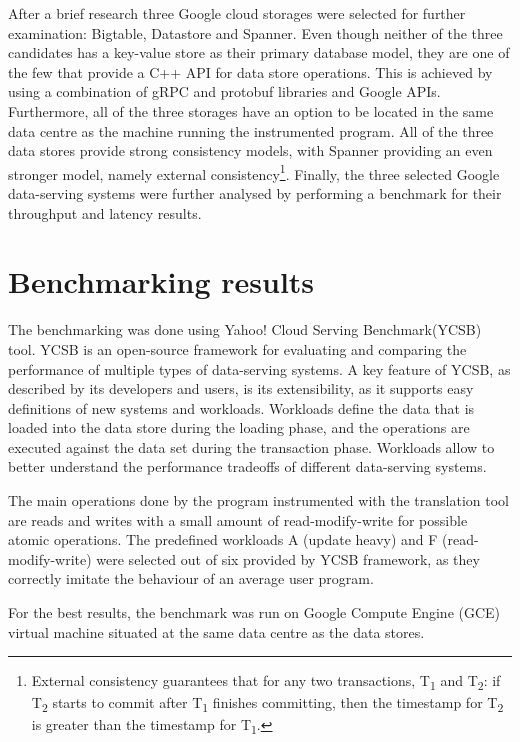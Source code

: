 \documentclass[bsc,frontabs,twoside,singlespacing,parskip,deptreport]{infthesis}     %
\begin{document}
After a brief research three Google cloud storages were selected for further examination: Bigtable, Datastore and Spanner. Even though neither of the three candidates has a key-value store as their primary database model, they are one of the few that provide a C++ API for data store operations. This is achieved by using a combination of gRPC and protobuf libraries and Google APIs. Furthermore, all of the three storages have an option to be located in the same data centre as the machine running the instrumented program. All of the three data stores provide strong consistency models, with Spanner providing an even stronger model, namely external consistency\footnote{External consistency guarantees that for any two transactions, T\textsubscript{1} and T\textsubscript{2}: if T\textsubscript{2} starts to commit after T\textsubscript{1} finishes committing, then the timestamp for T\textsubscript{2} is greater than the timestamp for T\textsubscript{1}.}. Finally, the three selected Google data-serving systems were further analysed by performing a benchmark for their throughput and latency results.

\section{Benchmarking results}

The benchmarking was done using Yahoo! Cloud Serving Benchmark(YCSB) \citep{ycsb} tool. YCSB is an open-source framework for evaluating and comparing the performance of multiple types of data-serving systems. A key feature of YCSB, as described by its developers and users, is its extensibility, as it supports easy definitions of new systems and workloads. Workloads define the data that is loaded into the data store during the loading phase, and the operations are executed against the data set during the transaction phase. Workloads allow to better understand the performance tradeoffs of different data-serving systems.

The main operations done by the program instrumented with the translation tool are reads and writes with a small amount of read-modify-write for possible atomic operations. The predefined workloads A (update heavy) and F (read-modify-write) were selected out of six provided by YCSB framework, as they correctly imitate the behaviour of an average user program. 

For the best results, the benchmark was run on Google Compute Engine (GCE) virtual machine situated at the same data centre as the data stores.
\end{document}
